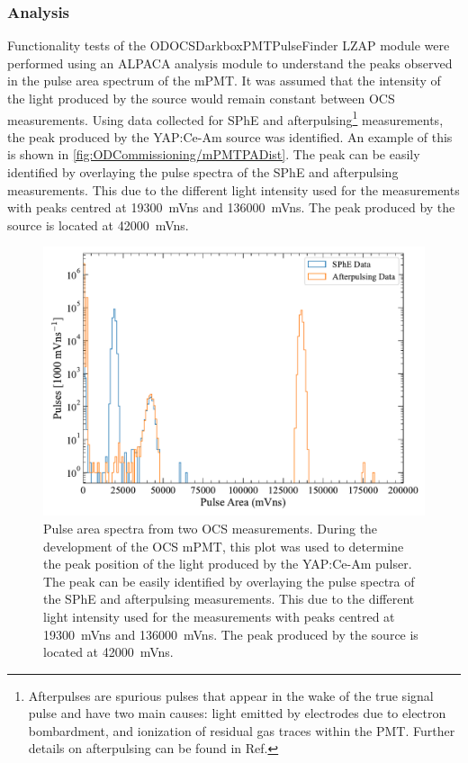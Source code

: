 \subsubsection{Analysis}\label{sec:ODCommissioning/MonitoringPMTAnalysis}
Functionality tests of the {\selectfont ODOCSDarkboxPMTPulseFinder} LZAP module were performed using an ALPACA analysis module to understand the peaks observed in the pulse area spectrum of the mPMT. It was assumed that the intensity of the light produced by the source would remain constant between OCS measurements. Using data collected for SPhE and afterpulsing\footnote{Afterpulses are spurious pulses that appear in the wake of the true signal pulse and have two main causes: light emitted by electrodes due to electron bombardment, and ionization of residual gas traces within the PMT. Further details on afterpulsing can be found in Ref.\cite{lkorley:thesis}} measurements, the peak produced by the YAP:Ce-Am source was identified. An example of this is shown in \autoref{fig:ODCommissioning/mPMTPADist}. The peak can be easily identified by overlaying the pulse spectra of the SPhE and afterpulsing measurements. This due to the different light intensity used for the measurements with peaks centred at 19300~mVns and 136000~mVns. The peak produced by the source is located at 42000~mVns.
\begin{figure}[ht!]
    \centering
    \includegraphics[width=0.8\linewidth]{figures/ODCommissioning/mPMT_PulseAreaSpectrum.pdf}
    \caption{Pulse area spectra from two OCS measurements. During the development of the OCS mPMT, this plot was used to determine the peak position of the light produced by the YAP:Ce-Am pulser. The peak can be easily identified by overlaying the pulse spectra of the SPhE and afterpulsing measurements. This due to the different light intensity used for the measurements with peaks centred at 19300~mVns and 136000~mVns. The peak produced by the source is located at 42000~mVns.}
    \label{fig:ODCommissioning/mPMTPADist}
\end{figure}
